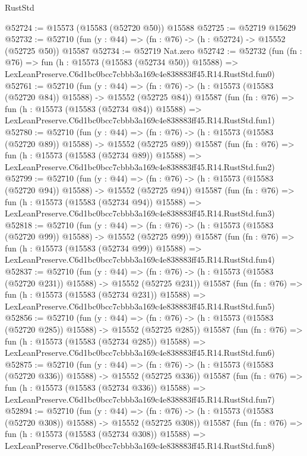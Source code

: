 \begin{lexlean}{RustStd}
\begin{coremodule}
@52724 := @15573 (@15583 (@52720 @50)) @15588
@52725 := @52719 @15629
@52732 := @52710 (fun (y : @44) => (fn : @76) -> (h : @52724) -> @15552 (@52725 @50)) @15587
@52734 := @52719 Nat.zero
@52742 := @52732
    (fun (fn : @76) =>
    fun (h : @15573 (@15583 (@52734 @50)) @15588) =>
    LexLeanPreserve.C6d1bc0bcc7cbbb3a169c4e838883ff45.R14.RustStd.fun0)
@52761 := @52710
    (fun (y : @44) =>
    (fn : @76) -> (h : @15573 (@15583 (@52720 @84)) @15588) -> @15552 (@52725 @84))
    @15587
    (fun (fn : @76) =>
    fun (h : @15573 (@15583 (@52734 @84)) @15588) =>
    LexLeanPreserve.C6d1bc0bcc7cbbb3a169c4e838883ff45.R14.RustStd.fun1)
@52780 := @52710
    (fun (y : @44) =>
    (fn : @76) -> (h : @15573 (@15583 (@52720 @89)) @15588) -> @15552 (@52725 @89))
    @15587
    (fun (fn : @76) =>
    fun (h : @15573 (@15583 (@52734 @89)) @15588) =>
    LexLeanPreserve.C6d1bc0bcc7cbbb3a169c4e838883ff45.R14.RustStd.fun2)
@52799 := @52710
    (fun (y : @44) =>
    (fn : @76) -> (h : @15573 (@15583 (@52720 @94)) @15588) -> @15552 (@52725 @94))
    @15587
    (fun (fn : @76) =>
    fun (h : @15573 (@15583 (@52734 @94)) @15588) =>
    LexLeanPreserve.C6d1bc0bcc7cbbb3a169c4e838883ff45.R14.RustStd.fun3)
@52818 := @52710
    (fun (y : @44) =>
    (fn : @76) -> (h : @15573 (@15583 (@52720 @99)) @15588) -> @15552 (@52725 @99))
    @15587
    (fun (fn : @76) =>
    fun (h : @15573 (@15583 (@52734 @99)) @15588) =>
    LexLeanPreserve.C6d1bc0bcc7cbbb3a169c4e838883ff45.R14.RustStd.fun4)
@52837 := @52710
    (fun (y : @44) =>
    (fn : @76) -> (h : @15573 (@15583 (@52720 @231)) @15588) -> @15552 (@52725 @231))
    @15587
    (fun (fn : @76) =>
    fun (h : @15573 (@15583 (@52734 @231)) @15588) =>
    LexLeanPreserve.C6d1bc0bcc7cbbb3a169c4e838883ff45.R14.RustStd.fun5)
@52856 := @52710
    (fun (y : @44) =>
    (fn : @76) -> (h : @15573 (@15583 (@52720 @285)) @15588) -> @15552 (@52725 @285))
    @15587
    (fun (fn : @76) =>
    fun (h : @15573 (@15583 (@52734 @285)) @15588) =>
    LexLeanPreserve.C6d1bc0bcc7cbbb3a169c4e838883ff45.R14.RustStd.fun6)
@52875 := @52710
    (fun (y : @44) =>
    (fn : @76) -> (h : @15573 (@15583 (@52720 @336)) @15588) -> @15552 (@52725 @336))
    @15587
    (fun (fn : @76) =>
    fun (h : @15573 (@15583 (@52734 @336)) @15588) =>
    LexLeanPreserve.C6d1bc0bcc7cbbb3a169c4e838883ff45.R14.RustStd.fun7)
@52894 := @52710
    (fun (y : @44) =>
    (fn : @76) -> (h : @15573 (@15583 (@52720 @308)) @15588) -> @15552 (@52725 @308))
    @15587
    (fun (fn : @76) =>
    fun (h : @15573 (@15583 (@52734 @308)) @15588) =>
    LexLeanPreserve.C6d1bc0bcc7cbbb3a169c4e838883ff45.R14.RustStd.fun8)

\end{coremodule}
\end{lexlean}
